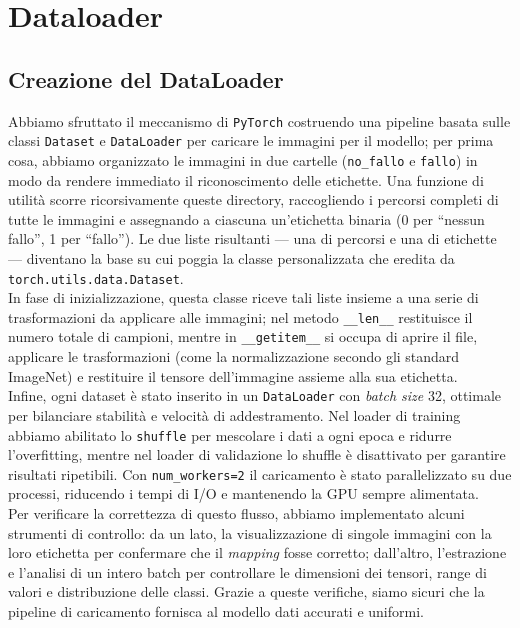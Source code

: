 \documentclass[main.tex]{subfiles}
\begin{document}
\section{Dataloader}\label{sec:cap 3}
\subsection{Creazione del DataLoader}

Abbiamo sfruttato il meccanismo di \texttt{PyTorch} costruendo una pipeline basata sulle classi \texttt{Dataset} e \texttt{DataLoader} per caricare le immagini per il modello; per prima cosa, abbiamo organizzato le immagini in due cartelle (\texttt{no\_fallo} e \texttt{fallo}) in modo da rendere immediato il riconoscimento delle etichette. Una funzione di utilità scorre ricorsivamente queste directory, raccogliendo i percorsi completi di tutte le immagini e assegnando a ciascuna un’etichetta binaria (0 per ``nessun fallo'', 1 per ``fallo''). Le due liste risultanti --- una di percorsi e una di etichette --- diventano la base su cui poggia la classe personalizzata che eredita da \texttt{torch.utils.data.Dataset}.\\
\noindent 
In fase di inizializzazione, questa classe riceve tali liste insieme a una serie di trasformazioni da applicare alle immagini; nel metodo \texttt{\_\_len\_\_} restituisce il numero totale di campioni, mentre in \texttt{\_\_getitem\_\_} si occupa di aprire il file, applicare le trasformazioni (come la normalizzazione secondo gli standard ImageNet) e restituire il tensore dell’immagine assieme alla sua etichetta.\\
\noindent
Infine, ogni dataset è stato inserito in un \texttt{DataLoader} con \textit{batch size} 32, ottimale per bilanciare stabilità e velocità di addestramento. Nel loader di training abbiamo abilitato lo \texttt{shuffle} per mescolare i dati a ogni epoca e ridurre l’overfitting, mentre nel loader di validazione lo shuffle è disattivato per garantire risultati ripetibili. Con \texttt{num\_workers=2} il caricamento è stato parallelizzato su due processi, riducendo i tempi di I/O e mantenendo la GPU sempre alimentata.\\
\noindent 
Per verificare la correttezza di questo flusso, abbiamo implementato alcuni strumenti di controllo: da un lato, la visualizzazione di singole immagini con la loro etichetta per confermare che il \textit{mapping} fosse corretto; dall’altro, l’estrazione e l’analisi di un intero batch per controllare le dimensioni dei tensori, range di valori e distribuzione delle classi. Grazie a queste verifiche, siamo sicuri che la pipeline di caricamento fornisca al modello dati accurati e uniformi.
\end{document}
